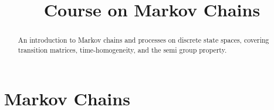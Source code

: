 \documentclass{xourse}
\title{Course on Markov Chains}
\author{}
\begin{document}
\begin{abstract}
    An introduction to Markov chains and processes on discrete state spaces, covering transition matrices, time-homogeneity, and the semi group property.
\end{abstract}
\maketitle

\part{Markov Chains}

\end{document}
